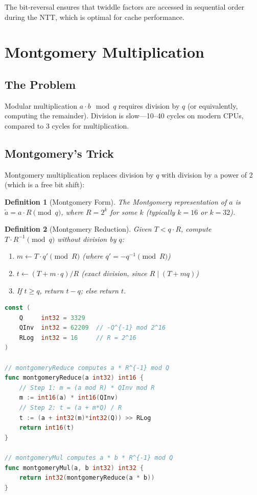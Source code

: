 \documentclass[11pt,a4paper]{article}
\newtheorem{definition}{Definition}
\begin{document}
The bit-reversal ensures that twiddle factors are accessed in sequential order during the
NTT, which is optimal for cache performance.

\section{Montgomery Multiplication}

\subsection{The Problem}

Modular multiplication $a \cdot b \mod q$ requires division by $q$ (or equivalently,
computing the remainder). Division is slow---10--40 cycles on modern CPUs, compared to
3 cycles for multiplication.

\subsection{Montgomery's Trick}

Montgomery multiplication replaces division by $q$ with division by a power of 2 (which
is a free bit shift):

\begin{definition}[Montgomery Form]
The Montgomery representation of $a$ is $\tilde{a} = a \cdot R \pmod{q}$, where
$R = 2^k$ for some $k$ (typically $k = 16$ or $k = 32$).
\end{definition}

\begin{definition}[Montgomery Reduction]
Given $T < q \cdot R$, compute $T \cdot R^{-1} \pmod{q}$ without division by $q$:
\begin{enumerate}[nosep]
  \item $m \leftarrow T \cdot q' \pmod{R}$ \quad (where $q' = -q^{-1} \pmod{R}$)
  \item $t \leftarrow (T + m \cdot q) / R$ \quad (exact division, since $R \mid (T + mq)$)
  \item If $t \geq q$, return $t - q$; else return $t$.
\end{enumerate}
\end{definition}

\begin{lstlisting}[language=Go,caption={Montgomery multiplication for $q = 3329$}]
const (
    Q     int32 = 3329
    QInv  int32 = 62209  // -Q^{-1} mod 2^16
    RLog  int32 = 16     // R = 2^16
)

// montgomeryReduce computes a * R^{-1} mod Q
func montgomeryReduce(a int32) int16 {
    // Step 1: m = (a mod R) * QInv mod R
    m := int16(a) * int16(QInv)
    // Step 2: t = (a + m*Q) / R
    t := (a + int32(m)*int32(Q)) >> RLog
    return int16(t)
}

// montgomeryMul computes a * b * R^{-1} mod Q
func montgomeryMul(a, b int32) int32 {
    return int32(montgomeryReduce(a * b))
}
\end{lstlisting}
\end{document}
